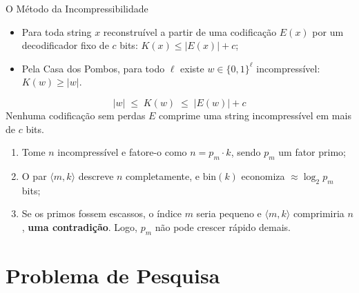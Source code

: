 \documentclass[10pt, aspectratio=43]{beamer}
\begin{document}
\begin{frame}{O Método da Incompressibilidade}
    \small
    \begin{itemize}
        \item Para toda string $x$ reconstruível a partir de uma codificação $E(x)$ por um decodificador fixo de $c$ bits: $K(x) \le |E(x)| + c$;
        \item Pela Casa dos Pombos, para todo $\ell$ existe $w \in \{0,1\}^\ell$ incompressível: $K(w) \ge |w|$.
    \end{itemize}
    \begin{tcolorbox}[pucbox, title=Motor do Método da Incompressibilidade]
        \begin{equation*}
            |w| \;\le\; K(w) \;\le\; |E(w)| + c
        \end{equation*}
        \footnotesize{Nenhuma codificação sem perdas $E$ comprime uma string incompressível em mais de $c$ bits.}
    \end{tcolorbox}
    \begin{enumerate}
        \item Tome $n$ incompressível e fatore-o como $n = p_m \cdot k$, sendo $p_m$ um fator primo;
        \item O par $\langle m, k \rangle$ descreve $n$ completamente, e $\text{bin}(k)$ economiza $\approx \log_2 p_m$ bits;
        \item Se os primos fossem escassos, o índice $m$ seria pequeno e $\langle m, k\rangle$ comprimiria $n$, \textbf{uma contradição}. Logo, $p_m$ não pode crescer rápido demais.
    \end{enumerate}
\end{frame}

\section[Problema]{Problema de Pesquisa}
\end{document}
